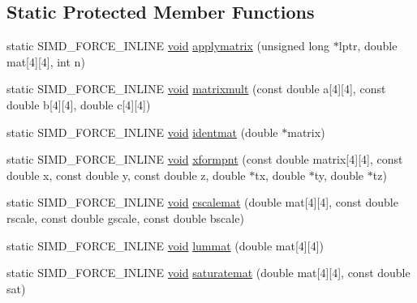 \subsection*{Static Protected Member Functions}
\begin{DoxyCompactItemize}
\item 
static S\+I\+M\+D\+\_\+\+F\+O\+R\+C\+E\+\_\+\+I\+N\+L\+I\+NE \mbox{\hyperlink{_thread_8h_af1e856da2e658414cb2456cb6f7ebc66}{void}} \mbox{\hyperlink{classnjli_1_1_color_util_a2142ab81f044133e0614dc341f699bb0}{applymatrix}} (unsigned long $\ast$lptr, double mat\mbox{[}4\mbox{]}\mbox{[}4\mbox{]}, int n)
\item 
static S\+I\+M\+D\+\_\+\+F\+O\+R\+C\+E\+\_\+\+I\+N\+L\+I\+NE \mbox{\hyperlink{_thread_8h_af1e856da2e658414cb2456cb6f7ebc66}{void}} \mbox{\hyperlink{classnjli_1_1_color_util_a5cb3576c8177f303c88dc4e7283367c7}{matrixmult}} (const double a\mbox{[}4\mbox{]}\mbox{[}4\mbox{]}, const double b\mbox{[}4\mbox{]}\mbox{[}4\mbox{]}, double c\mbox{[}4\mbox{]}\mbox{[}4\mbox{]})
\item 
static S\+I\+M\+D\+\_\+\+F\+O\+R\+C\+E\+\_\+\+I\+N\+L\+I\+NE \mbox{\hyperlink{_thread_8h_af1e856da2e658414cb2456cb6f7ebc66}{void}} \mbox{\hyperlink{classnjli_1_1_color_util_af683cd23fbe9098e277248be18047422}{identmat}} (double $\ast$matrix)
\item 
static S\+I\+M\+D\+\_\+\+F\+O\+R\+C\+E\+\_\+\+I\+N\+L\+I\+NE \mbox{\hyperlink{_thread_8h_af1e856da2e658414cb2456cb6f7ebc66}{void}} \mbox{\hyperlink{classnjli_1_1_color_util_a7db2133606fdf47afcbf7b8511a33dbe}{xformpnt}} (const double matrix\mbox{[}4\mbox{]}\mbox{[}4\mbox{]}, const double x, const double y, const double z, double $\ast$tx, double $\ast$ty, double $\ast$tz)
\item 
static S\+I\+M\+D\+\_\+\+F\+O\+R\+C\+E\+\_\+\+I\+N\+L\+I\+NE \mbox{\hyperlink{_thread_8h_af1e856da2e658414cb2456cb6f7ebc66}{void}} \mbox{\hyperlink{classnjli_1_1_color_util_a7b35d824b18625ef4fa732cd130cfeb3}{cscalemat}} (double mat\mbox{[}4\mbox{]}\mbox{[}4\mbox{]}, const double rscale, const double gscale, const double bscale)
\item 
static S\+I\+M\+D\+\_\+\+F\+O\+R\+C\+E\+\_\+\+I\+N\+L\+I\+NE \mbox{\hyperlink{_thread_8h_af1e856da2e658414cb2456cb6f7ebc66}{void}} \mbox{\hyperlink{classnjli_1_1_color_util_aeebe354f55f34c2671f42a6d0f4d1620}{lummat}} (double mat\mbox{[}4\mbox{]}\mbox{[}4\mbox{]})
\item 
static S\+I\+M\+D\+\_\+\+F\+O\+R\+C\+E\+\_\+\+I\+N\+L\+I\+NE \mbox{\hyperlink{_thread_8h_af1e856da2e658414cb2456cb6f7ebc66}{void}} \mbox{\hyperlink{classnjli_1_1_color_util_aa24bfa3faf934a7e9cb5fcb6551ada23}{saturatemat}} (double mat\mbox{[}4\mbox{]}\mbox{[}4\mbox{]}, const double sat)

\end{DoxyCompactItemize}
